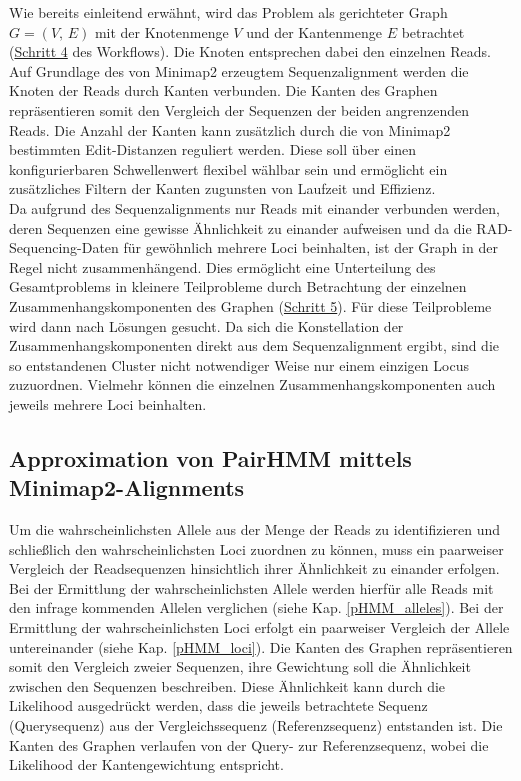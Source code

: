 Wie bereits einleitend erwähnt, wird das Problem als gerichteter Graph $G=(V, \, E)$ mit der Knotenmenge $V$ und der Kantenmenge $E$ betrachtet (\hyperref[step4]{Schritt 4\label{step4txt}} des Workflows). Die Knoten entsprechen dabei den einzelnen Reads. Auf Grundlage des von Minimap2 erzeugtem Sequenzalignment werden die Knoten der Reads durch Kanten verbunden. Die Kanten des Graphen repräsentieren somit den Vergleich der Sequenzen der beiden angrenzenden Reads. Die Anzahl der Kanten kann zusätzlich durch die von Minimap2 bestimmten Edit-Distanzen reguliert werden. Diese soll über einen konfigurierbaren Schwellenwert flexibel wählbar sein und ermöglicht ein zusätzliches Filtern der Kanten zugunsten von  Laufzeit und Effizienz. \\

Da aufgrund des Sequenzalignments nur Reads mit einander verbunden werden, deren Sequenzen eine gewisse Ähnlichkeit zu einander aufweisen und da die RAD-Sequencing-Daten für gewöhnlich mehrere Loci beinhalten, ist der Graph in der Regel nicht zusammenhängend. Dies ermöglicht eine Unterteilung des Gesamtproblems in kleinere Teilprobleme durch Betrachtung der einzelnen Zusammenhangskomponenten des Graphen (\hyperref[step5]{Schritt 5\label{step5txt}}). Für diese Teilprobleme wird dann nach Lösungen gesucht. Da sich die Konstellation der Zusammenhangskomponenten direkt aus dem Sequenzalignment ergibt, sind die so entstandenen Cluster nicht notwendiger Weise nur einem einzigen Locus zuzuordnen. Vielmehr können die einzelnen Zusammenhangskomponenten auch jeweils mehrere Loci beinhalten. \\

\subsection{Approximation von PairHMM mittels Minimap2-Alignments} \label{subsec:phmm_minimap}

Um die wahrscheinlichsten Allele aus der Menge der Reads zu identifizieren und schließlich den wahrscheinlichsten Loci zuordnen zu können, muss ein paarweiser Vergleich der Readsequenzen hinsichtlich ihrer Ähnlichkeit zu einander erfolgen. Bei der Ermittlung der wahrscheinlichsten Allele werden hierfür alle Reads mit den infrage kommenden Allelen verglichen (siehe Kap. \ref{pHMM_alleles}). Bei der Ermittlung der wahrscheinlichsten Loci erfolgt ein paarweiser Vergleich der Allele untereinander (siehe Kap. \ref{pHMM_loci}). Die Kanten des Graphen repräsentieren somit den Vergleich zweier Sequenzen, ihre Gewichtung soll die Ähnlichkeit zwischen den Sequenzen beschreiben. Diese Ähnlichkeit kann durch die Likelihood ausgedrückt werden, dass die jeweils betrachtete Sequenz (Querysequenz) aus der Vergleichssequenz (Referenzsequenz) entstanden ist. Die Kanten des Graphen verlaufen von der Query- zur Referenzsequenz, wobei die Likelihood der Kantengewichtung entspricht.\\

